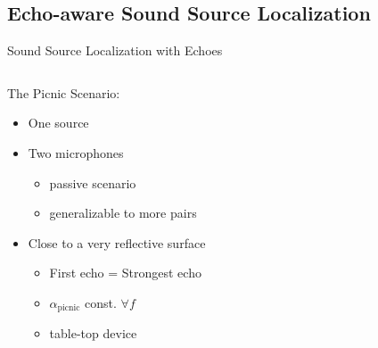 \subsection{Echo-aware Sound Source Localization}

\begin{frame}[t]{Sound Source Localization \alert{with Echoes} \hfill\faMapMarked*}

    \vspace*{5mm}
    \begin{columns}

        \begin{column}{0.5\textwidth}
            \begin{block}{The \alert{Picnic} Scenario:}
                \begin{itemize}
                    \small
                    \item<1-> One source
                    \item<1-> Two microphones
                    \begin{itemize}
                        \item<1->[$\rightarrow$] passive scenario
                        \item<1->[$\rightarrow$] generalizable to more pairs
                    \end{itemize}
                    \item<2-> Close to a very reflective surface
                    \begin{itemize}
                        \item<2->[$\rightarrow$] First echo = Strongest echo
                        \item<2->[$\rightarrow$] $\alpha_\text{picnic}$ const. $\forall f$
                        \item<2->[$\rightarrow$] table-top device
                    \end{itemize}
                \end{itemize}
            \end{block}
        \end{column}

        \begin{column}{0.5\textwidth}
            \centering
        \end{column}
    \end{columns}


\end{frame}
